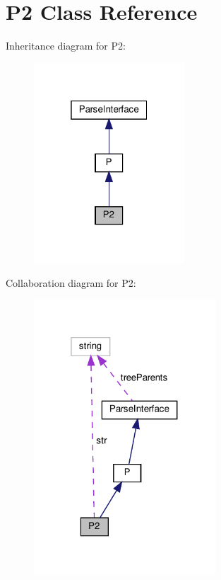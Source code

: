 \hypertarget{classP2}{}\section{P2 Class Reference}
\label{classP2}


Inheritance diagram for P2\+:
\nopagebreak
\begin{figure}[H]
\begin{center}
\leavevmode
\includegraphics[width=160pt]{classP2__inherit__graph}
\end{center}
\end{figure}


Collaboration diagram for P2\+:
\nopagebreak
\begin{figure}[H]
\begin{center}
\leavevmode
\includegraphics[width=193pt]{classP2__coll__graph}
\end{center}
\end{figure}
